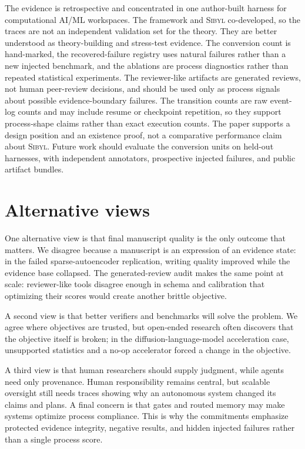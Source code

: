 \documentclass{article}
\newcommand{\sibyl}{\textsc{Sibyl}}
\begin{document}
The evidence is retrospective and concentrated in one author-built harness for computational AI/ML workspaces. The framework and \sibyl{} co-developed, so the traces are not an independent validation set for the theory. They are better understood as theory-building and stress-test evidence. The conversion count is hand-marked, the recovered-failure registry uses natural failures rather than a new injected benchmark, and the ablations are process diagnostics rather than repeated statistical experiments. The reviewer-like artifacts are generated reviews, not human peer-review decisions, and should be used only as process signals about possible evidence-boundary failures. The transition counts are raw event-log counts and may include resume or checkpoint repetition, so they support process-shape claims rather than exact execution counts. The paper supports a design position and an existence proof, not a comparative performance claim about \sibyl{}. Future work should evaluate the conversion units on held-out harnesses, with independent annotators, prospective injected failures, and public artifact bundles.

\section{Alternative views}
\label{sec:appendix-alternative-views}

One alternative view is that final manuscript quality is the only outcome that matters. We disagree because a manuscript is an expression of an evidence state: in the failed sparse-autoencoder replication, writing quality improved while the evidence base collapsed. The generated-review audit makes the same point at scale: reviewer-like tools disagree enough in schema and calibration that optimizing their scores would create another brittle objective.

A second view is that better verifiers and benchmarks will solve the problem. We agree where objectives are trusted, but open-ended research often discovers that the objective itself is broken; in the diffusion-language-model acceleration case, unsupported statistics and a no-op accelerator forced a change in the objective.

A third view is that human researchers should supply judgment, while agents need only provenance. Human responsibility remains central, but scalable oversight still needs traces showing why an autonomous system changed its claims and plans. A final concern is that gates and routed memory may make systems optimize process compliance. This is why the commitments emphasize protected evidence integrity, negative results, and hidden injected failures rather than a single process score.
\end{document}
